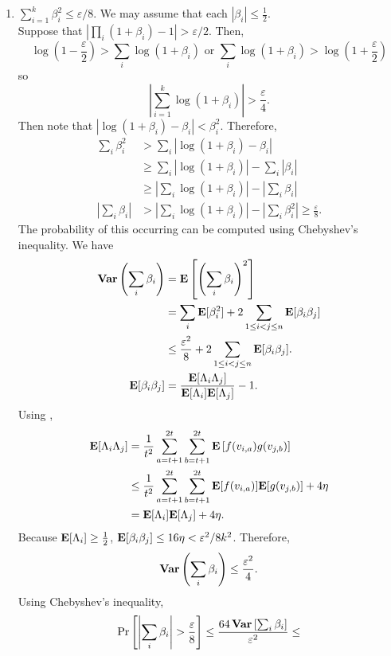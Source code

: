 \begin{enumerate}
	\item $\sum_{i=1}^k \beta_i^2 \leq \varepsilon/8$. We may assume that each $|\beta_i|\leq\frac{1}{2}$.\\
	Suppose that $\left| \prod_i\left(1+\beta_i\right) - 1 \right| > \varepsilon/2$. Then,
	\[ \log\left(1-\frac{\varepsilon}{2}\right) > \sum_i \log(1+\beta_i) \text{ or } \sum_i \log(1+\beta_i) > \log\left(1+\frac{\varepsilon}{2}\right) \]
	so
	\[ \left| \sum_{i=1}^k \log(1+\beta_i) \right| > \frac{\varepsilon}{4}. \]
	Then note that $|\log(1+\beta_i) - \beta_i| < \beta_i^2$. Therefore,
	\begin{align*}
		\sum_i \beta_i^2 &> \sum_i \left| \log(1+\beta_i) - \beta_i \right| \\
			&\geq \sum_i \left| \log(1+\beta_i) \right| - \sum_i \left| \beta_i \right| \\
			&\geq \left| \sum_i \log(1+\beta_i) \right| - \left| \sum_i \beta_i \right| \\
		\left| \sum_i \beta_i \right| &> \left| \sum_i \log(1+\beta_i) \right| - \left| \sum_i \beta_i^2 \right| \geq \frac{\varepsilon}{8}.
	\end{align*}
	The probability of this occurring can be computed using Chebyshev's inequality. We have
	\begin{align*}
		\operatorname{\textbf{Var}}\left(\sum_i \beta_i\right) &= \textbf{E}\left[\left(\sum_i\beta_i\right)^2\right] \\
			 &= \sum_i \textbf{E}[\beta_i^2] + 2 \sum_{1\leq i<j\leq n} \textbf{E}[\beta_i\beta_j] \\
			 &\leq \frac{\varepsilon^2}{8} + 2 \sum_{1\leq i<j\leq n} \textbf{E}[\beta_i\beta_j]. \\
		\textbf{E}[\beta_i\beta_j] &= \frac{\textbf{E}[\Lambda_i\Lambda_j]}{\textbf{E}[\Lambda_i]\textbf{E}[\Lambda_j]} - 1.
	\end{align*}
	Using ,
	\begin{align*}
		\textbf{E}[\Lambda_i\Lambda_j] &= \frac{1}{t^2} \sum_{a=t+1}^{2t} \sum_{b=t+1}^{2t} \textbf{E}\left[f(v_{i,a})g(v_{j,b})\right] \\
			&\leq \frac{1}{t^2} \sum_{a=t+1}^{2t} \sum_{b=t+1}^{2t} \textbf{E}[f(v_{i,a})]\textbf{E}[g(v_{j,b})] + 4\eta \\
			&= \textbf{E}[\Lambda_i]\textbf{E}[\Lambda_j] + 4\eta.
	\end{align*}
	Because $\textbf{E}[\Lambda_i] \geq \frac{1}{2}$, $\textbf{E}[\beta_i\beta_j] \leq 16\eta < \varepsilon^2/8k^2$. Therefore,
	\[ \operatorname{\textbf{Var}}\left(\sum_i \beta_i\right) \leq \frac{\varepsilon^2}{4}. \]
	Using Chebyshev's inequality,
	\[ \Pr\left[\left|\sum_i \beta_i\right| > \frac{\varepsilon}{8}\right] \leq \frac{64\operatorname{\textbf{Var}}\left[\sum_i\beta_i\right]}{\varepsilon^2} \leq  \]
\end{enumerate}


